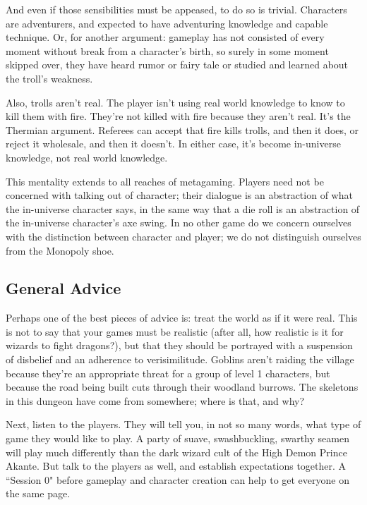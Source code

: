 \documentclass[twoside]{article}
\begin{document}
\bigbreak

And even if those sensibilities must be appeased, to do so is trivial. Characters are adventurers, and expected to have adventuring knowledge and capable technique. Or, for another argument: gameplay has not consisted of every moment without break from a character's birth, so surely in some moment skipped over, they have heard rumor or fairy tale or studied and learned about the troll's weakness.

\bigbreak

Also, trolls aren't real. The player isn't using real world knowledge to know to kill them with fire. They're not killed with fire because they aren't real. It's the Thermian argument. Referees can accept that fire kills trolls, and then it does, or reject it wholesale, and then it doesn't. In either case, it's become in-universe knowledge, not real world knowledge.

\bigbreak

This mentality extends to all reaches of metagaming. Players need not be concerned with talking out of character; their dialogue is an abstraction of what the in-universe character says, in the same way that a die roll is an abstraction of the in-universe character's axe swing. In no other game do we concern ourselves with the distinction between character and player; we do not distinguish ourselves from the Monopoly shoe.

\subsection*{General Advice}

Perhaps one of the best pieces of advice is: treat the world as if it were real. This is not to say that your games must be realistic (after all, how realistic is it for wizards to fight dragons?), but that they should be portrayed with a suspension of disbelief and an adherence to verisimilitude. Goblins aren't raiding the village because they're an appropriate threat for a group of level 1 characters, but because the road being built cuts through their woodland burrows. The skeletons in this dungeon have come from somewhere; where is that, and why?

\bigbreak

Next, listen to the players. They will tell you, in not so many words, what type of game they would like to play. A party of suave, swashbuckling, swarthy seamen will play much differently than the dark wizard cult of the High Demon Prince Akante. But talk to the players as well, and establish expectations together. A ``Session 0" before gameplay and character creation can help to get everyone on the same page.
\end{document}
